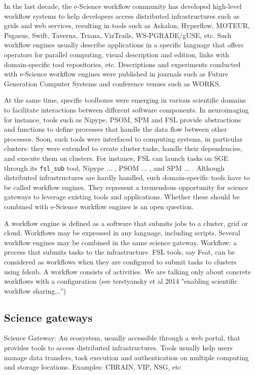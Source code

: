 \documentclass[preprint,3p,twocolumn]{elsarticle}
\newcommand{\todo}[1]{\color{blue} #1 \color{black}}
\begin{document}
In the last decade, the e-Science workflow community has developed
high-level workflow systems to help developers access distributed
infrastructures such as grids and web services, resulting in tools
such as Askalon, Hyperflow, MOTEUR, Pegasus, Swift, Taverna, Triana,
VizTrails, WS-PGRADE/gUSE, etc. Such workflow engines usually describe
applications in a specific language that offers operators for parallel
computing, visual description and edition, links with domain-specific
tool repositories, etc. Descriptions and experiments conducted with
e-Science workflow engines were published in journals such as Future
Generation Computer Systems and conference venues such as
WORKS. 

At the same time, specific toolboxes were emerging in various
scientific domains to facilitate interactions between different
software components. In neuroimaging for instance, tools such as
Nipype, PSOM, SPM and FSL provide abstractions and functions to define
processes that handle the data flow between other processes. Soon,
such tools were interfaced to computing systems, in particular
clusters: they were extended to create cluster tasks, handle their
dependencies, and execute them on clusters. For instance, FSL can
launch tasks on SGE through its \texttt{fsl\_sub} tool, Nipype
\todo{...}, PSOM \todo{...}, and SPM \todo{...}. Although distributed
infrastructures are hardly handled, such domain-specific tools have to
be called workflow engines. They represent a tremendous opportunity
for science gateways to leverage existing tools and
applications. Whether these should be combined with e-Science workflow
engines is an open question.

A workflow engine is defined as a software that submits jobs to a
cluster, grid or cloud. Workflows may be expressed in any language,
including scripts. Several workflow engines may be combined in the
same science gateway. Workflow: a process that submits tasks to the
infrastructure. FSL tools, say Feat, can be considered as workflows
when they are configured to submit tasks to clusters using fslsub. A
workflow consists of activities. We are talking only about concrete
workflows with a configuration (see terstyansky et al 2014 "enabling
scientific workflow sharing...")

\subsection{Science gateways}

Science Gateway: An ecosystem, usually accessible through a web
  portal, that provides tools to access distributed
  infrastructures. Tools usually help users manage data transfers,
  task execution and authentication on multiple computing and storage
  locations. Examples: CBRAIN, VIP, NSG, etc
\end{document}
